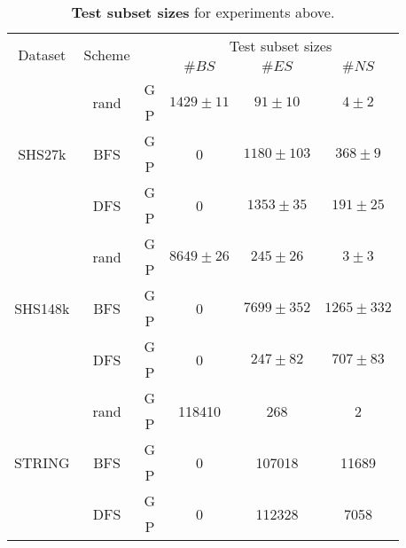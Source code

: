 \begin{table}[h]
    \caption{\label{subsets} \textbf{Test subset sizes} for experiments above.}
    \centering
    \begin{tabular}{cccccc}
    \toprule
    \multirow{2}{*}[-3pt]{Dataset} & \multirow{2}{*}[-3pt]{Scheme} &
    \multirow{2}{*}{} & \multicolumn{3}{c}{Test subset sizes} \\ 
            \cmidrule(l{3pt}r{3pt}){4-6}
      & &  &  $\#BS$  &     $\#ES$ &    $\#NS$ \\
    \midrule
    \multirow{6}{*}{SHS27k} & \multirow{2}{*}{rand} & G &  \multirow{2}{*}{$1429 \pm 11$} &      \multirow{2}{*}{$91 \pm 10$} &       \multirow{2}{*}{$4 \pm 2$} \\
    & & P &  &\\
    &\multirow{2}{*}{BFS}  & G   &       \multirow{2}{*}{0} &  \multirow{2}{*}{$1180 \pm 103$} &    \multirow{2}{*}{$368 \pm 9$} \\
    & & P &  & \\
    &\multirow{2}{*}{DFS}   & G   &       \multirow{2}{*}{0} &   \multirow{2}{*}{$1353 \pm 35$} &    \multirow{2}{*}{$191 \pm 25$} \\
    & & P &  & \\
    \midrule
    \multirow{6}{*}{SHS148k} & \multirow{2}{*}{rand} & G  &  \multirow{2}{*}{$8649 \pm 26$} &    \multirow{2}{*}{$245 \pm 26$} &       \multirow{2}{*}{$3 \pm 3$} \\
    & & P & & \\
    & \multirow{2}{*}{BFS}   & G  &     \multirow{2}{*}{0} &  \multirow{2}{*}{$7699 \pm 352$} &  \multirow{2}{*}{$1265 \pm 332$} \\
    & & P & & \\
    & \multirow{2}{*}{DFS}   & G  &      \multirow{2}{*}{0} &   \multirow{2}{*}{$247 \pm 82$} &    \multirow{2}{*}{$707 \pm 83$} \\
    & & P &  & \\
    \midrule
    \multirow{6}{*}{STRING} & \multirow{2}{*}{rand} & G &  \multirow{2}{*}{118410} &    \multirow{2}{*}{268} &       \multirow{2}{*}{2} \\
    & & P  & & \\
    & \multirow{2}{*}{BFS}  & G    &       \multirow{2}{*}{0} &  \multirow{2}{*}{107018} &  \multirow{2}{*}{11689} \\
    & & P & & \\
    & \multirow{2}{*}{DFS}  & G    &       \multirow{2}{*}{0} &   \multirow{2}{*}{112328} &    \multirow{2}{*}{7058} \\
    & & P & & \\
    \bottomrule
    \end{tabular}

\end{table}

